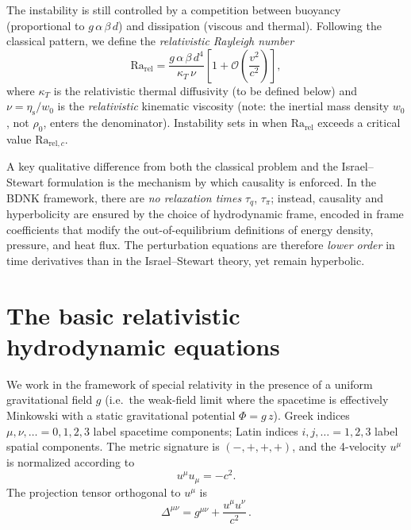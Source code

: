 The instability is still controlled by a competition between buoyancy
(proportional to $g\,\alpha\,\beta\,d$) and dissipation (viscous and thermal).
Following the classical pattern, we define the \emph{relativistic Rayleigh number}
\begin{equation}
\label{eq:rel2-4}
  \mathrm{Ra}_{\mathrm{rel}} = \frac{g\,\alpha\,\beta\,d^4}{\kappa_T\,\nu}
  \left[1 + \mathcal{O}\!\left(\frac{v^2}{c^2}\right)\right],
\end{equation}
where $\kappa_T$ is the relativistic thermal diffusivity (to be defined below)
and $\nu = \eta_{\mathrm{s}} / w_0$ is the \emph{relativistic} kinematic viscosity
(note: the inertial mass density $w_0$, not $\rho_0$, enters the denominator).
Instability sets in when $\mathrm{Ra}_{\mathrm{rel}}$ exceeds a critical value
$\mathrm{Ra}_{\mathrm{rel},c}$.

A key qualitative difference from both the classical problem and the
Israel--Stewart formulation is the mechanism by which causality is enforced.
In the BDNK framework, there are \emph{no relaxation times}
$\tau_q$, $\tau_\pi$; instead, causality and hyperbolicity are ensured by
the choice of hydrodynamic frame, encoded in frame coefficients that
modify the out-of-equilibrium definitions of energy density, pressure,
and heat flux.  The perturbation equations are therefore \emph{lower order}
in time derivatives than in the Israel--Stewart theory, yet remain
hyperbolic.

\section{The basic relativistic hydrodynamic equations}\label{sec:rel7}

We work in the framework of special relativity in the presence of a
uniform gravitational field $g$ (i.e.\ the weak-field limit where the
spacetime is effectively Minkowski with a static gravitational potential
$\Phi = g\,z$).  Greek indices $\mu,\nu,\ldots = 0,1,2,3$ label spacetime
components; Latin indices $i,j,\ldots = 1,2,3$ label spatial components.
The metric signature is $(-,+,+,+)$, and the 4-velocity $u^\mu$ is
normalized according to
\begin{equation}
\label{eq:rel2-5}
  u^\mu u_\mu = -c^2.
\end{equation}
The projection tensor orthogonal to $u^\mu$ is
\begin{equation}
\label{eq:rel2-6}
  \Delta^{\mu\nu} = g^{\mu\nu} + \frac{u^\mu u^\nu}{c^2}\,.
\end{equation}

